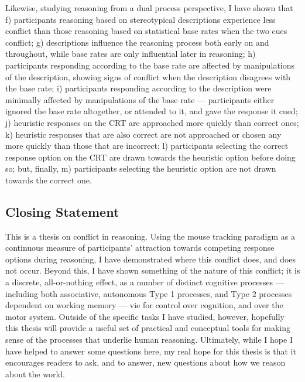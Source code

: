 Likewise, studying reasoning from a dual process perspective, I have shown that
f) participants reasoning based on stereotypical descriptions
experience less conflict than those reasoning based on statistical base rates
when the two cues conflict;
g) descriptions influence the reasoning process both early on and throughout,
while base rates are only influential later in reasoning;
h) participants responding according to the base rate
are affected by manipulations of the description,
showing signs of conflict when the description disagrees with the base rate;
i) participants responding according to the description
were minimally affected by manipulations of the base rate ---
participants either ignored the base rate altogether,
or attended to it, and gave the response it cued;
j) heuristic responses on the CRT are approached more quickly than correct ones;
k) heuristic responses that are also correct
are not approached or chosen any more quickly than those that are incorrect;
l) participants selecting the correct response option on the CRT
are drawn towards the heuristic option before doing so; but, finally,
m) participants selecting the heuristic option
are not drawn towards the correct one.


\subsection{Closing Statement}

This is a thesis on conflict in reasoning.
Using the mouse tracking paradigm as a continuous measure
of participants' attraction towards competing response options during reasoning,
I have demonstrated where this conflict does, and does not occur.
Beyond this, I have shown something of the nature of this conflict;
it is a discrete, all-or-nothing effect,
as a number of distinct cognitive processes ---
including both associative, autonomous Type 1 processes,
and Type 2 processes dependent on working memory ---
vie for control over cognition, and over the motor system.
Outside of the specific tasks I have studied, however,
hopefully this thesis will provide a useful set of
practical and conceptual tools for making sense of
the processes that underlie human reasoning.
Ultimately, while I hope I have helped to answer some questions here,
my real hope for this thesis is that
it encourages readers
to ask, and to answer, new questions
about how we reason about the world.


